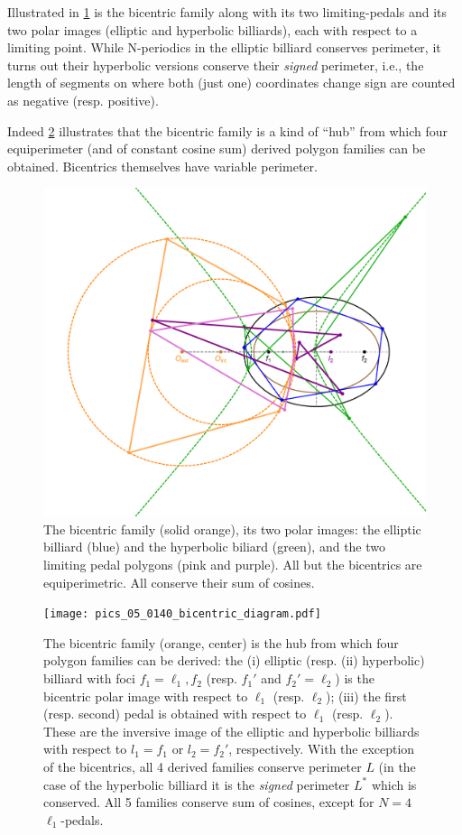 Illustrated in \cref{fig:five-polys} is the bicentric family along with its two limiting-pedals and its two polar images (elliptic and hyperbolic billiards), each with respect to a limiting point. While N-periodics in the elliptic billiard conserves perimeter, it turns out their hyperbolic versions conserve their {\em signed} perimeter, i.e., the length of segments on where both (just one) coordinates change sign are counted as negative (resp. positive).

Indeed \cref{fig:bicentric-diagram} illustrates that the bicentric family is a kind of ``hub'' from which four equiperimeter (and of constant cosine sum) derived polygon families can be obtained. Bicentrics themselves have variable perimeter.

\begin{figure}
    \centering
    \includegraphics[width=\textwidth]{chap_05/pics/pics_05_0130_five_polys.pdf}
    \caption{The bicentric family (solid orange), its two polar images: the elliptic billiard (blue) and the hyperbolic biliard (green), and the two limiting pedal polygons (pink and purple). All but the bicentrics are equiperimetric. All conserve their sum of cosines.}
    \label{fig:five-polys}
\end{figure}


\begin{figure}
    \centering
    \texttt{[image: pics\_05\_0140\_bicentric\_diagram.pdf]}
    \caption{The bicentric family (orange, center) is the hub from which four polygon families can be derived: the (i) elliptic (resp. (ii) hyperbolic) billiard with foci $f_1=\ell_1,f_2$ (resp. $f_1'$ and $f_2'=\ell_2$) is the bicentric polar image with respect to $\ell_1$ (resp. $\ell_2$); (iii) the first (resp. second) pedal is obtained with respect to $\ell_1$ (resp. $\ell_2$). These are the inversive image of the elliptic and hyperbolic billiards with respect to $l_1=f_1$ or $l_2=f_2'$, respectively. With the exception of the bicentrics, all 4 derived families conserve perimeter $L$ (in the case of the hyperbolic billiard it is the {\em signed} perimeter $L^*$ which is conserved. All 5 families conserve sum of cosines, except for $N=4$ $\ell_1$-pedals.}
    \label{fig:bicentric-diagram}
\end{figure}